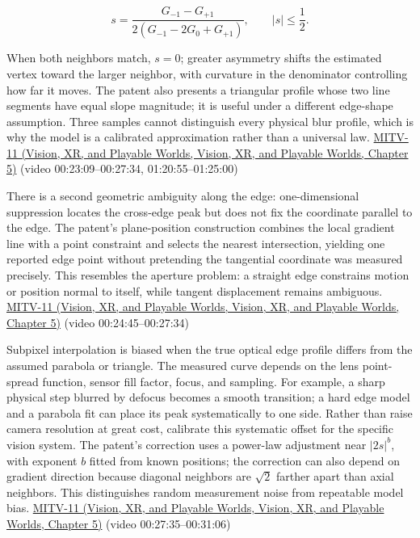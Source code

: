 \[
s=\frac{G_{-1}-G_{+1}}{2(G_{-1}-2G_0+G_{+1})},\qquad |s|\le\frac12.
\]

When both neighbors match, \(s=0\); greater asymmetry shifts the estimated vertex toward the larger neighbor, with curvature in the denominator controlling how far it moves. The patent also presents a triangular profile whose two line segments have equal slope magnitude; it is useful under a different edge-shape assumption. Three samples cannot distinguish every physical blur profile, which is why the model is a calibrated approximation rather than a universal law. \href{../07-Vision-XR-and-Playable-Worlds/main.pdf\#nameddest=04-visual-computing-ii-ch036-mitv-11---edge-detection-subpixel-position-cordic-line-detection-us-6408109}{MITV-11 (Vision, XR, and Playable Worlds, Vision, XR, and Playable Worlds, Chapter 5)} (video 00:23:09--00:27:34, 01:20:55--01:25:00)

There is a second geometric ambiguity along the edge: one-dimensional suppression locates the cross-edge peak but does not fix the coordinate parallel to the edge. The patent's plane-position construction combines the local gradient line with a point constraint and selects the nearest intersection, yielding one reported edge point without pretending the tangential coordinate was measured precisely. This resembles the aperture problem: a straight edge constrains motion or position normal to itself, while tangent displacement remains ambiguous. \href{../07-Vision-XR-and-Playable-Worlds/main.pdf\#nameddest=04-visual-computing-ii-ch036-mitv-11---edge-detection-subpixel-position-cordic-line-detection-us-6408109}{MITV-11 (Vision, XR, and Playable Worlds, Vision, XR, and Playable Worlds, Chapter 5)} (video 00:24:45--00:27:34)

Subpixel interpolation is biased when the true optical edge profile differs from the assumed parabola or triangle. The measured curve depends on the lens point-spread function, sensor fill factor, focus, and sampling. For example, a sharp physical step blurred by defocus becomes a smooth transition; a hard edge model and a parabola fit can place its peak systematically to one side. Rather than raise camera resolution at great cost, calibrate this systematic offset for the specific vision system. The patent's correction uses a power-law adjustment near \(|2s|^b\), with exponent \(b\) fitted from known positions; the correction can also depend on gradient direction because diagonal neighbors are \(\sqrt2\) farther apart than axial neighbors. This distinguishes random measurement noise from repeatable model bias. \href{../07-Vision-XR-and-Playable-Worlds/main.pdf\#nameddest=04-visual-computing-ii-ch036-mitv-11---edge-detection-subpixel-position-cordic-line-detection-us-6408109}{MITV-11 (Vision, XR, and Playable Worlds, Vision, XR, and Playable Worlds, Chapter 5)} (video 00:27:35--00:31:06)

